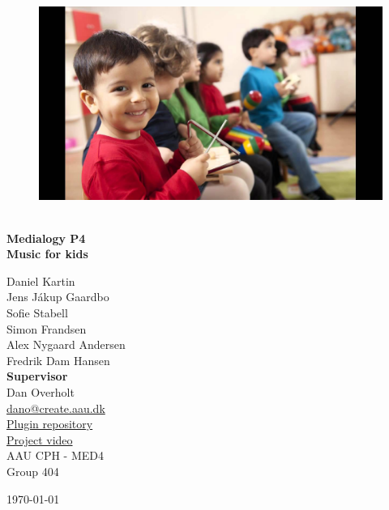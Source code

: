 \begin{titlepage}
			
\addtolength{\voffset}{2cm}

\begin{figure}[H]
\centering
\vspace{2cm}	%
\includegraphics[width=0.99\linewidth]{figure/Frontpage/frontpage}
\end{figure}

\mbox{}
\vfill
\renewcommand{\familydefault}{\sfdefault} \normalfont %
\HRule\\[0.1cm]
\textbf{{\small Medialogy P4\\ {\Huge Music for kids}}} \hspace{0.15cm}\\
\HRule\smallskip{}
\begin{multicols}{2}
{\Large Daniel Kartin\\Jens Jákup Gaardbo\\Sofie Stabell\\Simon Frandsen\\Alex Nygaard Andersen\\Fredrik Dam Hansen\columnbreak}\\
\setlength{\parskip}{2.4cm}
{\Large{\textbf{Supervisor}\\Dan Overholt\\\href{mailto:dano@create.aau.dk}{\color{blue}dano@create.aau.dk}}}\medskip\\
\href{https://github.com/totalfreak/medialogyp4code}{\color{blue}Plugin repository}\\
\href{https:google.com}{\color{blue}Project video}\medskip
\\\small AAU CPH - 
MED4 \\
Group 404\\
\end{multicols}
\today
\renewcommand{\familydefault}{\rmdefault} \normalfont %
\end{titlepage}


